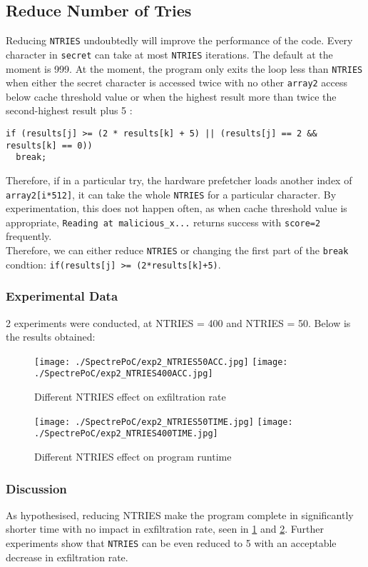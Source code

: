 \documentclass[10pt,twocolumn,letterpaper]{article}
\begin{document}
\subsection{Reduce Number of Tries}
Reducing \texttt{NTRIES} undoubtedly will improve the performance of the code. Every character in \texttt{secret} can take at most \texttt{NTRIES} iterations. The default at the moment is 999. At the moment, the program only exits the loop less than \texttt{NTRIES} when either the secret character is accessed twice with no other \texttt{array2} access below cache threshold value or when the highest result more than twice the second-highest result plus 5 :
\begin{lstlisting}
if (results[j] >= (2 * results[k] + 5) || (results[j] == 2 && results[k] == 0))
  break;
\end{lstlisting}
Therefore, if in a particular try, the hardware prefetcher loads another index of \texttt{array2[i*512]}, it can take the whole \texttt{NTRIES} for a particular character. By experimentation, this does not happen often, as when cache threshold value is appropriate, \lstinline{Reading at malicious_x...} returns success with \texttt{score=2} frequently.\\
Therefore, we can either reduce \texttt{NTRIES} or changing the first part of the \texttt{break} condtion: \lstinline{if(results[j] >= (2*results[k]+5)}.

\subsubsection{Experimental Data}
2 experiments were conducted, at NTRIES = 400 and NTRIES = 50. Below is the results obtained:
\begin{figure}[h]
	\begin{center}
	\texttt{[image: ./SpectrePoC/exp2\_NTRIES50ACC.jpg]}
	\texttt{[image: ./SpectrePoC/exp2\_NTRIES400ACC.jpg]}
	\caption{Different NTRIES effect on exfiltration rate}
	\label{exp21}
	\end{center}
\end{figure}

\begin{figure}[h]
	\centering
	\texttt{[image: ./SpectrePoC/exp2\_NTRIES50TIME.jpg]}
	\texttt{[image: ./SpectrePoC/exp2\_NTRIES400TIME.jpg]}
	\caption{Different NTRIES effect on program runtime}
	\label{exp22}
\end{figure}
\subsubsection{Discussion}
As hypothesised, reducing NTRIES make the program complete in significantly shorter time with no impact in exfiltration rate, seen in \ref{exp21} and \ref{exp22}. Further experiments show that \texttt{NTRIES} can be even reduced to 5 with an acceptable decrease in exfiltration rate.
\end{document}
